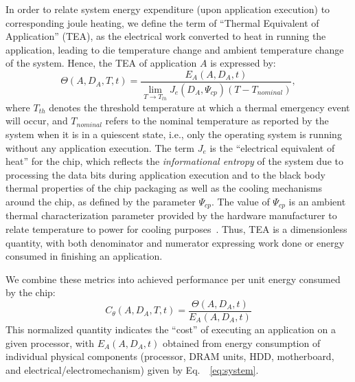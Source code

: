 \documentclass[times, 10pt,twocolumn]{IEEEtran}
\newcommand{\equationname}{Eq.\ }
\begin{document}
In order to relate system energy expenditure (upon application
execution) to corresponding joule heating, we define the term of
``Thermal Equivalent of Application'' (TEA), as the electrical work
converted to heat in running the application, leading to die temperature
change and ambient temperature change of the system.  Hence, the TEA of
application $A$ is expressed by:
\begin{equation}
\label{eq:tea} \Theta(A, D_{A}, T, t) =
\frac{E_{A}(A, D_{A}, t)}{\displaystyle \lim_{T \to T_{th}} J_e(D_{A}, \Psi_{cp}) (T -T_{nominal})},
\end{equation} 
where $T_{th}$ denotes the threshold temperature at which a thermal
emergency event will occur, and $T_{nominal}$ refers to the nominal
temperature as reported by the system when it is in a quiescent state,
i.e., only the operating system is running without any application
execution.  The term $J_{e}$ is the ``electrical equivalent of heat''
for the chip, which reflects the \textit{informational
  entropy} of the system due to processing the data bits
during application execution and to the black body thermal properties of
the chip packaging as well as the cooling mechanisms around the chip, as
defined by the parameter $\Psi_{cp}$.  The value of $\Psi_{cp}$ is an
ambient thermal characterization parameter provided by the hardware
manufacturer to relate temperature to power for cooling
purposes~\cite{Intel2006}.  Thus, TEA is a dimensionless quantity, with
both denominator and numerator expressing work done or energy consumed
in finishing an application.

We combine these metrics into achieved performance per unit energy
consumed by the chip:
\begin{equation}
\label{eq:thermcost} C_{\theta}(A, D_{A}, T, t)=\frac{\Theta (A, D_{A}, t)}{E_{A}(A, D_{A}, t)}
\end{equation}
This normalized quantity indicates the ``cost'' of executing an
application on a given processor, with $E_{A}(A, D_{A}, t)$ obtained
from energy consumption of individual physical components (processor,
DRAM units, HDD, motherboard, and electrical/electromechanism) given by
\equationname~\eqref{eq:system}.
\end{document}
